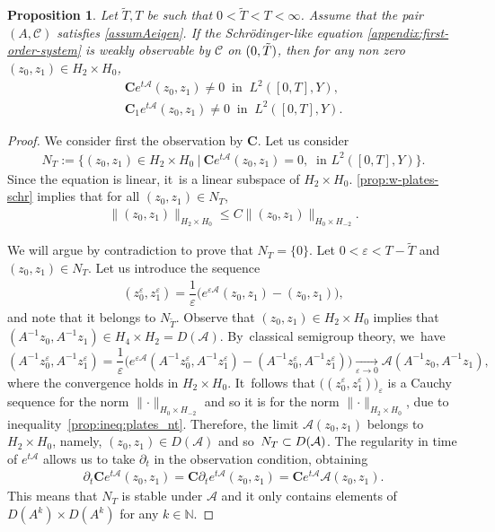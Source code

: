 \documentclass[JEP,XML,SOM,Unicode,published]{cedram}
\newtheorem{proposition}[theorem]{Proposition}
\theoremstyle{definition}
\let\mc\mathcal
\let\veps\varepsilon
\newcommand{\A}{\mc{A}}
\newcommand{\N}{\mathbb{N}}
\newcommand{\bC}{\boldsymbol{C}}
\providecommand{\norm}[1]{\lVert#1\rVert}
\begin{document}
\begin{proposition}\label{prop:nt-plates}
Let $\widetilde{T},T$ be such that $0 < \widetilde{T} < T < \infty$. Assume that the pair $(A, \mc{C})$ satisfies \cref{assumAeigen}. If the Schrödinger-like equation
\eqref{appendix:first-order-system} is weakly observable by $\mc{C}$ on $(0, \Tilde{T})$, then for any non zero $(z_0, z_1)\in H_2\times H_0$,
\begin{align*}
\bC e^{t\A}(z_0, z_1)\neq 0\ \text{ in }\ L^2([0, T], Y),\\
\bC_1 e^{t\A}(z_0, z_1)\neq 0\ \text{ in }\ L^2([0, T], Y).
\end{align*}
\end{proposition}
\begin{proof}
We consider first the observation by $\bC$. Let us consider
\begin{align*}
N_T:=\{(z_0, z_1)\in H_2\times H_0\ |\ \bC e^{t\A}(z_0, z_1)=0,\ \text{ in } L^2([0,T], Y)\}.
\end{align*}
Since the equation is linear, it~is a linear subspace of $H_2\times H_0$. \cref{prop:w-plates-schr} implies that for all $(z_0, z_1)\in N_T$,
\begin{align}\label{prop:ineq:plates_nt}
\norm{(z_0, z_1)}_{H_2\times H_0}\leq C\norm{(z_0, z_1)}_{H_0\times H_{-2}}.
\end{align}

We will argue by contradiction to prove that $N_T=\{0\}$. Let $0<\veps<T-\widetilde{T}$ and $(z_0, z_1)\in N_T$. Let us introduce the sequence
\begin{align*}
(z_0^\veps, z_1^\veps)=\dfrac{1}{\veps}\big(e^{\veps\A}(z_0, z_1)-(z_0, z_1)\big),
\end{align*}
and note that it belongs to $N_{\widetilde{T}}$. Observe that $(z_0, z_1)\in H_2\times H_0$ implies that $(A^{-1}z_0, A^{-1}z_1)\in H_4\times H_2=D(\A)$. By~classical semigroup theory, we~have
\[
(A^{-1}z_0^\veps, A^{-1}z_1^\veps)=\dfrac{1}{\veps}\big(e^{\veps\A}(A^{-1}z_0^\veps, A^{-1}z_1^\veps)-(A^{-1}z_0^\veps, A^{-1}z_1^\veps)\big)
\xrightarrow[\veps\to 0]{} \A (A^{-1}z_0, A^{-1}z_1),
\]
where the convergence holds in $H_2\times H_0$. It~follows that $\big((z_0^\veps, z_1^\veps)\big)_{\veps}$ is a Cauchy sequence for the norm $\norm{\cdot}_{H_0\times H_{-2}}$ and so it is for the norm $\norm{\cdot}_{H_2\times H_{0}}$, due to inequality~\eqref{prop:ineq:plates_nt}. Therefore, the limit $\A(z_0, z_1)$ belongs to $H_2\times H_0$, namely, $(z_0, z_1)\in D(\A)$ and so~$N_T\subset\nobreak D(\A)$. The regularity in time of $e^{t\A}$ allows us to take $\partial_t$ in the observation condition, obtaining
\begin{align*}
\partial_t\bC e^{t\A}(z_0, z_1)=\bC \partial_t e^{t\A}(z_0, z_1)=\bC e^{t\A}\A(z_0, z_1).
\end{align*}
This means that $N_T$ is stable under $\A$ and it only contains elements of $D(A^k)\times D(A^k)$ for any $k\in \N$.


\end{proof}
\end{document}
